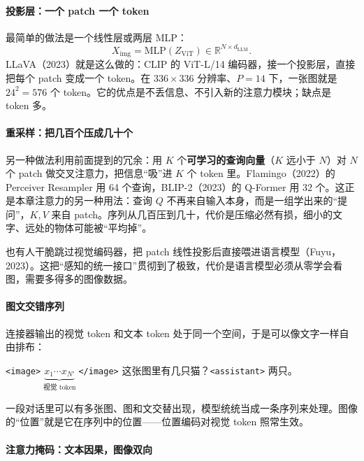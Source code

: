 \paragraph{投影层：一个 patch 一个 token}

最简单的做法是一个线性层或两层 MLP：
\begin{equation}
    X_{\text{img}} = \mathrm{MLP}(Z_{\text{ViT}}) \in \mathbb{R}^{N \times d_{\text{LLM}}}.
\end{equation}
LLaVA（2023）就是这么做的：CLIP 的 ViT-L/14 编码器，接一个投影层，直接把每个 patch 变成一个 token。在 $336 \times 336$ 分辨率、$P = 14$ 下，一张图就是 $24^2 = 576$ 个 token。它的优点是不丢信息、不引入新的注意力模块；缺点是 token 多。

\paragraph{重采样：把几百个压成几十个}

另一种做法利用前面提到的冗余：用 $K$ 个\textbf{可学习的查询向量}（$K$ 远小于 $N$）对 $N$ 个 patch 做交叉注意力，把信息“吸”进 $K$ 个 token 里。Flamingo（2022）的 Perceiver Resampler 用 64 个查询，BLIP-2（2023）的 Q-Former 用 32 个。这正是本章注意力的另一种用法：查询 $Q$ 不再来自输入本身，而是一组学出来的“提问”，$K, V$ 来自 patch。序列从几百压到几十，代价是压缩必然有损，细小的文字、远处的物体可能被“平均掉”。

也有人干脆跳过视觉编码器，把 patch 线性投影后直接喂进语言模型（Fuyu，2023）。这把“感知的统一接口”贯彻到了极致，代价是语言模型必须从零学会看图，需要多得多的图像数据。

\paragraph{图文交错序列}

连接器输出的视觉 token 和文本 token 处于同一个空间，于是可以像文字一样自由排布：
\begin{center}
\texttt{<image>}$\;\underbrace{x_1 \cdots x_{N'}}_{\text{视觉 token}}\;$\texttt{</image>} 这张图里有几只猫？\texttt{<assistant>} 两只。
\end{center}
一段对话里可以有多张图、图和文交替出现，模型统统当成一条序列来处理。图像的“位置”就是它在序列中的位置——位置编码对视觉 token 照常生效。

\paragraph{注意力掩码：文本因果，图像双向}

